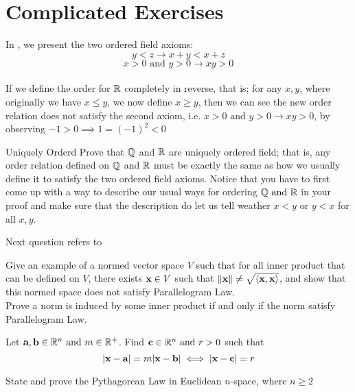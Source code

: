\documentclass{report}
\begin{document}
\section{Complicated Exercises}
In , we present the two ordered field axioms:
\begin{equation}
y<z\longrightarrow x+y<x+z
\end{equation}
\begin{equation}
x>0\text{ and }y>0\longrightarrow xy>0
\end{equation}\\
If we define the order for $\mathbb{R}$ completely in reverse, that is; for any $x,y$, where originally we  have  $x\leq y$, we now define $x\geq y$, then we can see the new order relation does not satisfy the second axiom, i.e. $x>0\text{ and }y>0\rightarrow xy>0$, by observing $-1>0\implies 1=(-1)^2<0$
\begin{question}{
  Uniquely Orderd}{}
Prove that $\mathbb{Q}$ and $\mathbb{R}$ are uniquely ordered field; that is, any order relation defined on $\mathbb{Q}$ and  $\mathbb{R}$ must be exactly the same as how we usually define it to satisfy the two ordered field axioms. Notice that you have to first come up with a way to describe our usual ways for ordering $\mathbb{Q}\text{ and }\mathbb{R}$ in your proof and make sure that the description do let us tell weather $x< y$ or $y< x$ for all $x,y$.       
\end{question}
Next question refers to 
\begin{question}{}{}
  Give an example of a normed vector space $V$ such that for all inner product that can be defined on $V$, there exists  $\textbf{x}\in V$ such that $\| \textbf{x} \|\neq \sqrt{\langle \textbf{x},\textbf{x} \rangle}$, and show that this normed space does not satisfy Parallelogram Law.\\

Prove a norm is induced by some inner product if and only if the norm satisfy Parallelogram Law.
\end{question}
\begin{question}{}{}
Let $\textbf{a},\textbf{b}\in\mathbb{R}^n\text{ and }m \in\mathbb{R}^+$. Find $\textbf{c}\in\mathbb{R}^n\text{ and }r>0$ such that
\begin{equation}
|\textbf{x}-\textbf{a}|=m|\textbf{x}-\textbf{b}|\iff |\textbf{x}-\textbf{c}|=r
\end{equation}
\end{question} 
\begin{question}{}{}
State and prove the Pythagorean Law in Euclidean $n$-space, where  $n\geq 2$
\end{question}
\end{document}
